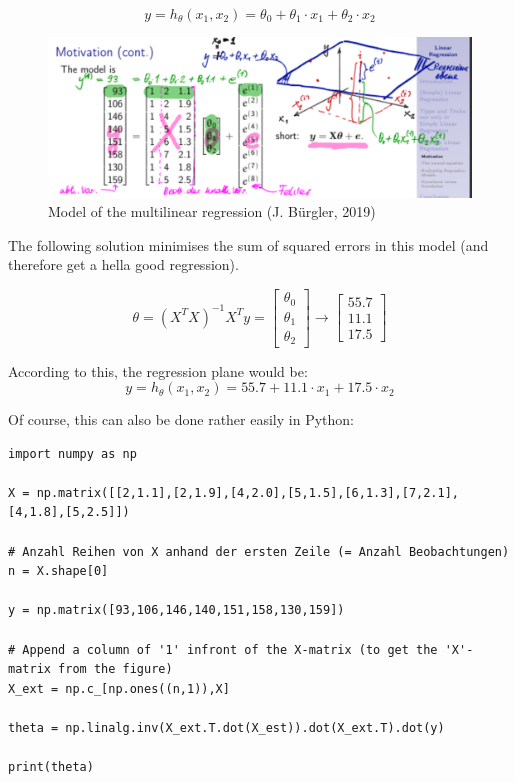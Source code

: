 \documentclass[11pt]{article}
\begin{document}
\vspace{10px}

\begin{equation*}
    y = h_\theta (x_1, x_2) = \theta_0 + \theta_1 \cdot x_1 + \theta_2 \cdot x_2
\end{equation*}

\begin{figure}[htb!]
    \centering
    \includegraphics[keepaspectratio=true, width=\linewidth]{multilinear_regression.png}
    \caption{Model of the multilinear regression (\textcopyright J. Bürgler, 2019)}
    \label{multilinear_regression}
\end{figure}

\noindent
The following solution minimises the sum of squared errors in this model (and therefore get a hella good regression).

\begin{equation*}
    \theta = (X^T X)^{-1} X^T y =
    \begin{bmatrix}
        \theta_0 \\
        \theta_1 \\
        \theta_2
    \end{bmatrix}
    \rightarrow
    \begin{bmatrix}
        55.7 \\
        11.1 \\
        17.5
    \end{bmatrix}
\end{equation*}

\noindent
According to this, the regression plane would be:
\begin{equation*}
    y = h_\theta (x_1, x_2) = 55.7 + 11.1 \cdot x_1 + 17.5 \cdot x_2
\end{equation*}

\newpage

\noindent
Of course, this can also be done rather easily in Python:

\begin{lstlisting}
import numpy as np

X = np.matrix([[2,1.1],[2,1.9],[4,2.0],[5,1.5],[6,1.3],[7,2.1],[4,1.8],[5,2.5]])

# Anzahl Reihen von X anhand der ersten Zeile (= Anzahl Beobachtungen)
n = X.shape[0]

y = np.matrix([93,106,146,140,151,158,130,159])

# Append a column of '1' infront of the X-matrix (to get the 'X'-matrix from the figure) 
X_ext = np.c_[np.ones((n,1)),X]

theta = np.linalg.inv(X_ext.T.dot(X_est)).dot(X_ext.T).dot(y)

print(theta)
\end{lstlisting}
\end{document}
